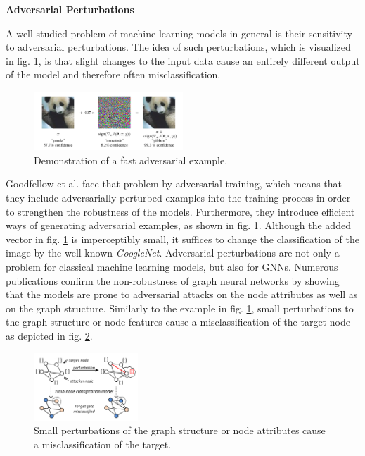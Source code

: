 \documentclass[a4paper,preprint]{sig-alternate}
\begin{document}
\textbf{Adversarial Perturbations}\newline

A well-studied problem of machine learning models in general is their sensitivity to adversarial perturbations. \cite{Goodfellow_2015}
The idea of such perturbations, which is visualized in fig. \ref{fig:adversarial_example}, is that slight changes to the input data
cause an entirely different output of the model and therefore often misclassification.

\begin{figure}[h]
    \centering
    \includegraphics[width=0.5\textwidth]{img/adversarial_example.png}
    \caption{Demonstration of a fast adversarial example. \cite{Goodfellow_2015}}
    \label{fig:adversarial_example}
\end{figure}

Goodfellow et al. \cite{Goodfellow_2015} face that problem by adversarial training, which means that they include adversarially 
perturbed examples into the training process in order to strengthen the robustness of the models. Furthermore, they introduce 
efficient ways of generating adversarial examples, as shown in fig. \ref{fig:adversarial_example}.
Although the added vector in fig. \ref{fig:adversarial_example} is imperceptibly small, it suffices to change the classification
of the image by the well-known \textit{GoogleNet}. \cite{Goodfellow_2015}\newline
Adversarial perturbations are not only a problem for classical machine learning models, but also for GNNs.
Numerous publications confirm the non-robustness of graph neural networks by showing that the models are prone to
adversarial attacks on the node attributes as well as on the graph structure. \cite{Zuegner_2019}
Similarly to the example in fig. \ref{fig:adversarial_example}, small perturbations to the graph structure or node features 
cause a misclassification of the target node as depicted in fig. \ref{fig:adversarial_GNN}.

\begin{figure}[h]
    \centering
    \includegraphics[width=0.35\textwidth]{img/adversarial_GNN.png}
    \caption{Small perturbations of the graph structure or node attributes cause a misclassification of the target. \cite{Zuegner_2018}}
    \label{fig:adversarial_GNN}
\end{figure}
\end{document}
